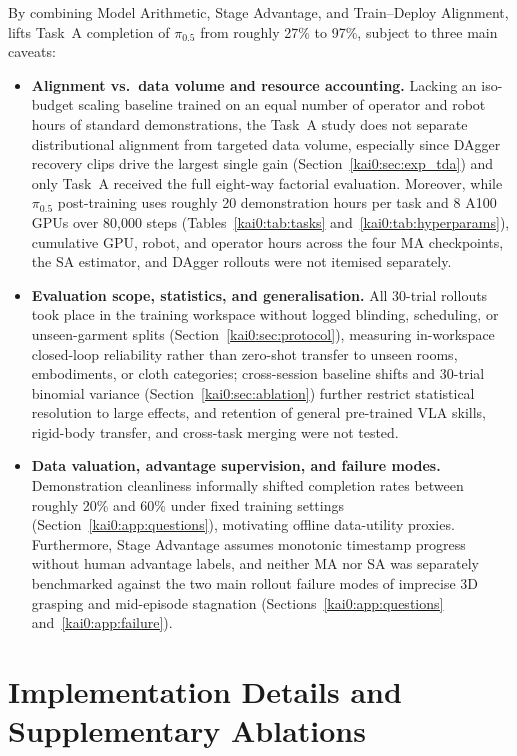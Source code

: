 By combining Model Arithmetic, Stage Advantage, and Train--Deploy Alignment, \chiz lifts Task~A completion of $\pi_{0.5}$ from roughly 27\% to 97\%, subject to three main caveats:
\begin{itemize}
  \item \textbf{Alignment vs.\ data volume and resource accounting.} Lacking an iso-budget scaling baseline trained on an equal number of operator and robot hours of standard demonstrations, the Task~A study does not separate distributional alignment from targeted data volume, especially since DAgger recovery clips drive the largest single gain (Section~\ref{kai0:sec:exp_tda}) and only Task~A received the full eight-way factorial evaluation. Moreover, while $\pi_{0.5}$ post-training uses roughly 20 demonstration hours per task and 8 A100 GPUs over 80{,}000 steps (Tables~\ref{kai0:tab:tasks} and~\ref{kai0:tab:hyperparams}), cumulative GPU, robot, and operator hours across the four MA checkpoints, the SA estimator, and DAgger rollouts were not itemised separately.
  \item \textbf{Evaluation scope, statistics, and generalisation.} All 30-trial rollouts took place in the training workspace without logged blinding, scheduling, or unseen-garment splits (Section~\ref{kai0:sec:protocol}), measuring in-workspace closed-loop reliability rather than zero-shot transfer to unseen rooms, embodiments, or cloth categories; cross-session baseline shifts and 30-trial binomial variance (Section~\ref{kai0:sec:ablation}) further restrict statistical resolution to large effects, and retention of general pre-trained VLA skills, rigid-body transfer, and cross-task merging were not tested.
  \item \textbf{Data valuation, advantage supervision, and failure modes.} Demonstration cleanliness informally shifted completion rates between roughly 20\% and 60\% under fixed training settings (Section~\ref{kai0:app:questions}), motivating offline data-utility proxies. Furthermore, Stage Advantage assumes monotonic timestamp progress without human advantage labels, and neither MA nor SA was separately benchmarked against the two main rollout failure modes of imprecise 3D grasping and mid-episode stagnation (Sections~\ref{kai0:app:questions} and~\ref{kai0:app:failure}).
\end{itemize}

\section{Implementation Details and Supplementary Ablations}\label{app:kai0}

